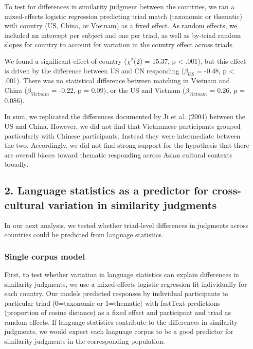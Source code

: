 \documentclass[10pt, letterpaper]{article}
\begin{document}
To test for differences in similarity judgment between the countries, we
ran a mixed-effects logistic regression predicting triad match
(taxonomic or thematic) with country (US, China, or Vietnam) as a fixed
effect. As random effects, we included an intercept per subject and one
per triad, as well as by-triad random slopes for country to account for
variation in the country effect across triads.

We found a significant effect of country (\(\chi^2\)(2) = 15.37, p
\textless{} .001), but this effect is driven by the difference between
US and CN responding (\(\beta_{US}\) = -0.48, p \textless{} .001). There
was no statistical difference between matching in Vietnam and China
(\(\beta_{Vietnam}\) = -0.22, p = 0.09), or the US and Vietnam
(\(\beta_{Vietnam}\) = 0.26, p = 0.086).

In sum, we replicated the differences documented by Ji et al. (2004)
between the US and China. However, we did not find that Vietnamese
participants grouped particularly with Chinese participants. Instead
they were intermediate between the two. Accordingly, we did not find
strong support for the hypothesis that there are overall biases toward
thematic responding across Asian cultural contexts broadly.

\hypertarget{language-statistics-as-a-predictor-for-cross-cultural-variation-in-similarity-judgments}{%
\subsection{2. Language statistics as a predictor for cross-cultural
variation in similarity
judgments}\label{language-statistics-as-a-predictor-for-cross-cultural-variation-in-similarity-judgments}}

In our next analysis, we tested whether triad-level differences in
judgments across countries could be predicted from language statistics.

\hypertarget{single-corpus-model}{%
\subsubsection{Single corpus model}\label{single-corpus-model}}

First, to test whether variation in language statistics can explain
differences in similarity judgments, we use a mixed-effects logistic
regression fit individually for each country. Our models predicted
responses by individual participants to particular triad (0=taxonomic or
1=thematic) with fastText predictions (proportion of cosine distance) as
a fixed effect and participant and triad as random effects. If language
statistics contribute to the differences in similarity judgments, we
would expect each language corpus to be a good predictor for similarity
judgments in the corresponding population.
\end{document}
